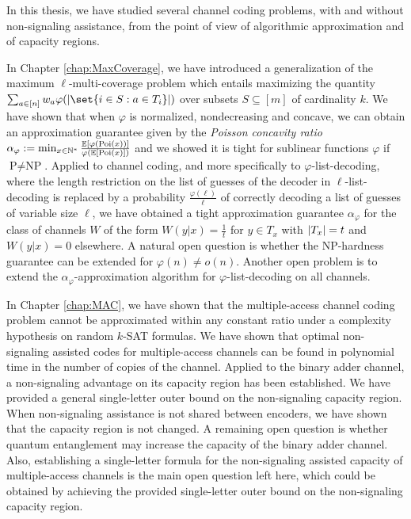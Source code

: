 In this thesis, we have studied several channel coding problems, with and without non-signaling assistance, from the point of view of algorithmic approximation and of capacity regions.

In Chapter \ref{chap:MaxCoverage}, we have introduced a generalization of the maximum $\ell$-multi-coverage problem which entails maximizing the quantity $\sum_{a \in [n]}  w_a\varphi(\abs{\set{i \in S : a \in T_i}})$ over subsets $S \subseteq [m]$ of cardinality $k$. We have shown that when $\varphi$ is normalized, nondecreasing and concave, we can obtain an approximation guarantee given by the \emph{Poisson concavity ratio} $\alpha_{\varphi} := \min_{x \in \mathbb{N}^*} \frac{\mathbb{E}[\varphi(\operatorname{\text{Poi}}(x))]}{\varphi(\mathbb{E}[\operatorname{\text{Poi}}(x)])}$ and we showed it is tight for sublinear functions $\varphi$ if $\textrm{P}\not=\textrm{NP}$. Applied to channel coding, and more specifically to $\varphi$-list-decoding, where the length restriction on the list of guesses of the decoder in $\ell$-list-decoding is replaced by a probability $\frac{\varphi(\ell)}{\ell}$ of correctly decoding a list of guesses of variable size $\ell$, we have obtained a tight approximation guarantee $\alpha_{\varphi}$ for the class of channels $W$ of the form $W(y|x) = \frac{1}{t}$ for $y \in T_x$ with $\abs{T_x}=t$ and $W(y|x) = 0$ elsewhere. A natural open question is whether the \textrm{NP}-hardness guarantee can be extended for $\varphi(n) \not= o(n)$. Another open problem is to extend the $\alpha_{\varphi}$-approximation algorithm for $\varphi$-list-decoding on all channels.

In Chapter \ref{chap:MAC}, we have shown that the multiple-access channel coding problem cannot be approximated within any constant ratio under a complexity hypothesis on random $k$-SAT formulas. We have shown that optimal non-signaling assisted codes for multiple-access channels can be found in polynomial time in the number of copies of the channel. Applied to the binary adder channel, a non-signaling advantage on its capacity region has been established. We have provided a general single-letter outer bound on the non-signaling capacity region. When non-signaling assistance is not shared between encoders, we have shown that the capacity region is not changed. A remaining open question is whether quantum entanglement may increase the capacity of the binary adder channel. Also, establishing a single-letter formula for the non-signaling assisted capacity of multiple-access channels is the main open question left here, which could be obtained by achieving the provided single-letter outer bound on the non-signaling capacity region.

